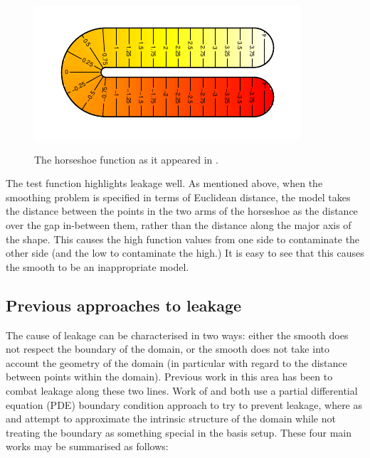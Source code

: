 \begin{figure}
\centering
\includegraphics{intro/figs/orig-fs.pdf}\\
\caption{The horseshoe function as it appeared in .}
\label{orig-fs}
\end{figure}

The test function highlights leakage well. As mentioned above, when the smoothing problem is specified in terms of Euclidean distance, the model takes the distance between the points in the two arms of the horseshoe as the distance over the gap in-between them, rather than the distance along the major axis of the shape. This causes the high function values from one side to contaminate the other side (and the low to contaminate the high.) It is easy to see that this causes the smooth to be an inappropriate model.
		
\subsection{Previous approaches to leakage}
\label{intro-leakageapproaches}

The cause of leakage can be characterised in two ways: either the smooth does not respect the boundary of the domain, or the smooth does not take into account the geometry of the domain (in particular with regard to the distance between points within the domain). Previous work in this area has been to combat leakage along these two lines. Work of  and  both use a partial differential equation (PDE) boundary condition approach to try to prevent leakage, where as  and   attempt to approximate the intrinsic structure of the domain while not treating the boundary as something special in the basis setup. These four main works may be summarised as follows:

